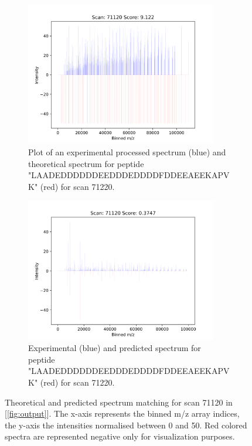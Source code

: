 \documentclass[11pt]{article}
\begin{document}
\begin{figure}
\centering
\begin{subfigure}[b]{1\textwidth}
\centering
    \includegraphics[width=0.92\textwidth]{figs/scan_71120_ps=False.png}
   \caption{Plot of an experimental processed spectrum (blue) and theoretical spectrum for peptide "LAADEDDDDDDEEDDDEDDDDFDDEEAEEKAPVK" (red) for scan 71220.}
   \label{fig:theo_71120} 
\end{subfigure}
\begin{subfigure}[b]{1\textwidth}
\centering
   \includegraphics[width=0.92\textwidth]{figs/scan_71120_ps=True.png}
   \caption{Experimental (blue) and predicted spectrum for peptide "LAADEDDDDDDEEDDDEDDDDFDDEEAEEKAPVK" (red) for scan 71220.}
   \label{fig:predict_71120}
\end{subfigure}
\caption{Theoretical and predicted spectrum matching for scan 71120 in [\cref{fig:output}]. The x-axis represents the binned m/z array indices, the y-axis the intensities normalised between 0 and 50. Red colored spectra are represented negative only for visualization purposes.}
\label{fig:predandtheo_71120}
\end{figure}
\end{document}
